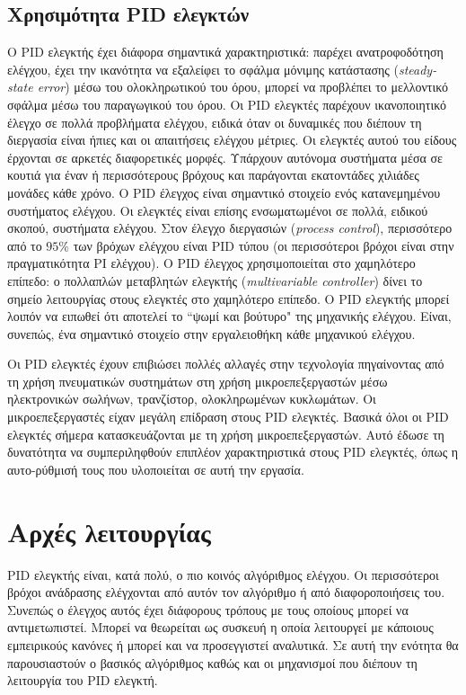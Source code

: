 \subsection{Χρησιμότητα PID ελεγκτών}

Ο PID ελεγκτής έχει διάφορα σημαντικά χαρακτηριστικά: παρέχει ανατροφοδότηση ελέγχου, έχει την ικανότητα να εξαλείφει το σφάλμα μόνιμης κατάστασης (\emph{steady-state error}) μέσω του ολοκληρωτικού του όρου, μπορεί να προβλέπει το μελλοντικό σφάλμα μέσω του παραγωγικού του όρου. Οι PID ελεγκτές παρέχουν ικανοποιητικό έλεγχο σε πολλά προβλήματα ελέγχου, ειδικά όταν οι δυναμικές που διέπουν τη διεργασία είναι ήπιες και οι απαιτήσεις ελέγχου μέτριες. Οι ελεγκτές αυτού του είδους έρχονται σε αρκετές διαφορετικές μορφές. Υπάρχουν αυτόνομα συστήματα μέσα σε κουτιά για έναν ή περισσότερους βρόχους και παράγονται εκατοντάδες χιλιάδες μονάδες κάθε χρόνο. Ο PID έλεγχος είναι σημαντικό στοιχείο ενός κατανεμημένου συστήματος ελέγχου. Οι ελεγκτές είναι επίσης ενσωματωμένοι σε πολλά, ειδικού σκοπού, συστήματα ελέγχου. Στον έλεγχο διεργασιών (\emph{process control}), περισσότερο από το $95\%$ των βρόχων ελέγχου είναι PID τύπου (οι περισσότεροι βρόχοι είναι στην πραγματικότητα PI ελέγχου). Ο PID έλεγχος χρησιμοποιείται στο χαμηλότερο επίπεδο: ο πολλαπλών μεταβλητών ελεγκτής (\emph{multivariable controller}) δίνει το σημείο λειτουργίας στους ελεγκτές στο χαμηλότερο επίπεδο. Ο PID ελεγκτής μπορεί λοιπόν να ειπωθεί ότι αποτελεί το ``ψωμί και βούτυρο" της μηχανικής ελέγχου. Είναι, συνεπώς, ένα σημαντικό στοιχείο στην εργαλειοθήκη κάθε μηχανικού ελέγχου. 

Οι PID ελεγκτές έχουν επιβιώσει πολλές αλλαγές στην τεχνολογία πηγαίνοντας από τη χρήση πνευματικών συστημάτων στη χρήση μικροεπεξεργαστών μέσω ηλεκτρονικών σωλήνων, τρανζίστορ, ολοκληρωμένων κυκλωμάτων. Οι μικροεπεξεργαστές είχαν μεγάλη επίδραση στους PID ελεγκτές. Βασικά όλοι οι PID ελεγκτές σήμερα κατασκευάζονται με τη χρήση μικροεπεξεργαστών. Αυτό έδωσε τη δυνατότητα να συμπεριληφθούν επιπλέον χαρακτηριστικά στους PID ελεγκτές, όπως η αυτο-ρύθμισή τους που υλοποιείται σε αυτή την εργασία.

\section{Αρχές λειτουργίας}

\lettrine[findent=2pt]{}{} PID ελεγκτής είναι, κατά πολύ, ο πιο κοινός αλγόριθμος ελέγχου. Οι περισσότεροι βρόχοι ανάδρασης ελέγχονται από αυτόν τον αλγόριθμο ή από διαφοροποιήσεις του. Συνεπώς ο έλεγχος αυτός έχει διάφορους τρόπους με τους οποίους μπορεί να αντιμετωπιστεί. Μπορεί να θεωρείται ως συσκευή η οποία λειτουργεί με κάποιους εμπειρικούς κανόνες ή μπορεί και να προσεγγιστεί αναλυτικά. Σε αυτή την ενότητα θα παρουσιαστούν ο βασικός αλγόριθμος καθώς και οι μηχανισμοί που διέπουν τη λειτουργία του PID ελεγκτή.

